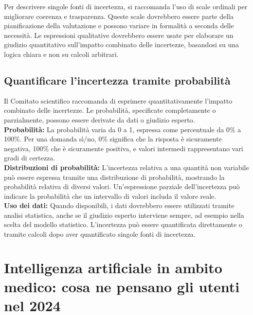 Per descrivere singole fonti di incertezza, si raccomanda l'uso di scale ordinali per migliorare coerenza e trasparenza. Queste scale dovrebbero essere parte della pianificazione della valutazione e possono variare in formalità a seconda delle necessità. Le espressioni qualitative dovrebbero essere usate per elaborare un giudizio quantitativo sull'impatto combinato delle incertezze, basandosi su una logica chiara e non su calcoli arbitrari.\\

\subsection{Quantificare l'incertezza tramite probabilità}

Il Comitato scientifico raccomanda di esprimere quantitativamente l'impatto combinato delle incertezze. Le probabilità, specificate completamente o parzialmente, possono essere derivate da dati o giudizio esperto.\\

\textbf{Probabilità:} La probabilità varia da 0 a 1, espressa come percentuale da 0\% a 100\%. Per una domanda sì/no, 0\% significa che la risposta è sicuramente negativa, 100\% che è sicuramente positiva, e valori intermedi rappresentano vari gradi di certezza.\\

\textbf{Distribuzioni di probabilità:} L'incertezza relativa a una quantità non variabile può essere espressa tramite una distribuzione di probabilità, mostrando la probabilità relativa di diversi valori. Un'espressione parziale dell'incertezza può indicare la probabilità che un intervallo di valori includa il valore reale.\\

\textbf{Uso dei dati:} Quando disponibili, i dati dovrebbero essere utilizzati tramite analisi statistica, anche se il giudizio esperto interviene sempre, ad esempio nella scelta del modello  statistico. L'incertezza può essere quantificata direttamente o tramite calcoli dopo aver quantificato singole fonti di incertezza.\\



\section{Intelligenza artificiale in ambito medico: cosa ne pensano gli utenti nel 2024}

